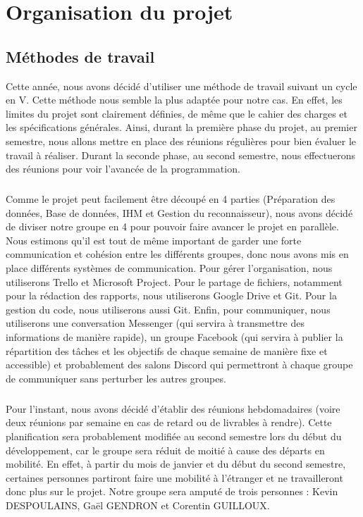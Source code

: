 \hypertarget{c6}{\chapter{Organisation du projet}}

\section{Méthodes de travail}

Cette année, nous avons décidé d’utiliser une méthode de travail suivant un cycle en V.
Cette méthode nous semble la plus adaptée pour notre cas. En effet, les limites du projet
sont clairement définies, de même que le cahier des charges et les spécifications générales.
Ainsi, durant la première phase du projet, au premier semestre, nous allons mettre en place
des réunions régulières pour bien évaluer le travail à réaliser. Durant la seconde phase,
au second semestre, nous effectuerons des réunions pour voir l’avancée de la programmation.

\paragraph{}
Comme le projet peut facilement être découpé en 4 parties (Préparation des données,
Base de données, IHM et Gestion du reconnaisseur), nous avons décidé de diviser notre
groupe en 4 pour pouvoir faire avancer le projet en parallèle. Nous estimons qu’il est
tout de même important de garder une forte communication et cohésion entre les différents
groupes, donc nous avons mis en place différents systèmes de communication. Pour gérer
l’organisation, nous utiliserons Trello et Microsoft Project. Pour le partage de fichiers,
notamment pour la rédaction des rapports, nous utiliserons Google Drive et Git.
Pour la gestion du code, nous utiliserons aussi Git. Enfin, pour communiquer, nous
utiliserons une conversation Messenger (qui servira à transmettre des informations de
manière rapide), un groupe Facebook (qui servira à publier la répartition des tâches et
les objectifs de chaque semaine de manière fixe et accessible) et probablement des salons
Discord qui permettront à chaque groupe de communiquer sans perturber les autres groupes.

\paragraph{}
Pour l’instant, nous avons décidé d’établir des réunions hebdomadaires (voire deux réunions
par semaine en cas de retard ou de livrables à rendre). Cette planification sera probablement
modifiée au second semestre lors du début du développement, car le groupe sera réduit de
moitié à cause des départs en mobilité. En effet, à partir du mois de janvier et du début du
second semestre, certaines personnes partiront faire une mobilité à l’étranger et ne
travailleront donc plus sur le projet. Notre groupe sera amputé de trois personnes : Kevin
DESPOULAINS, Gaël GENDRON et Corentin GUILLOUX.

